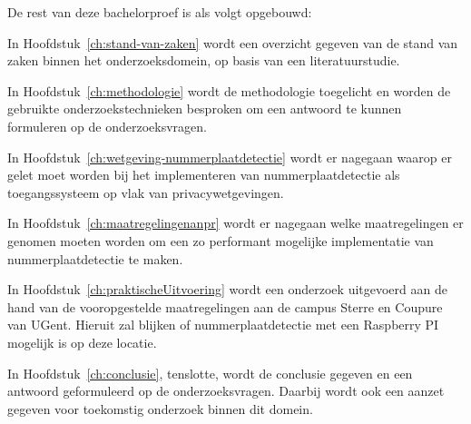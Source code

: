 
De rest van deze bachelorproef is als volgt opgebouwd:

In Hoofdstuk~\ref{ch:stand-van-zaken} wordt een overzicht gegeven van de stand van zaken binnen het onderzoeksdomein, op basis van een literatuurstudie.

In Hoofdstuk~\ref{ch:methodologie} wordt de methodologie toegelicht en worden de gebruikte onderzoekstechnieken besproken om een antwoord te kunnen formuleren op de onderzoeksvragen.

In Hoofdstuk~\ref{ch:wetgeving-nummerplaatdetectie} wordt er nagegaan waarop er gelet moet worden bij het implementeren van nummerplaatdetectie als toegangssysteem op vlak van privacywetgevingen.

In Hoofdstuk~\ref{ch:maatregelingenanpr} wordt er nagegaan welke maatregelingen er genomen moeten worden om een zo performant mogelijke implementatie van nummerplaatdetectie te maken.

In Hoofdstuk~\ref{ch:praktischeUitvoering} wordt een onderzoek uitgevoerd aan de hand van de vooropgestelde maatregelingen aan de campus Sterre en Coupure van UGent. Hieruit zal blijken of nummerplaatdetectie met een Raspberry PI mogelijk is op deze locatie.

In Hoofdstuk~\ref{ch:conclusie}, tenslotte, wordt de conclusie gegeven en een antwoord geformuleerd op de onderzoeksvragen. Daarbij wordt ook een aanzet gegeven voor toekomstig onderzoek binnen dit domein.